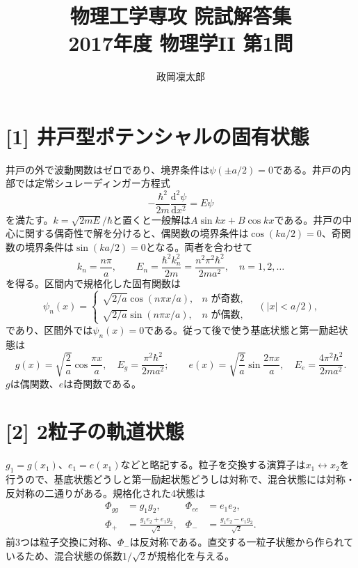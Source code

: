 \documentclass[11pt,a4paper]{article}
\title{物理工学専攻 院試解答集\\2017年度 物理学II 第1問}
\author{政岡凜太郎}
\date{}
\begin{document}
\maketitle

\section*{[1] 井戸型ポテンシャルの固有状態}
井戸の外で波動関数はゼロであり、境界条件は$\psi(\pm a/2)=0$である。井戸の内部では定常シュレーディンガー方程式
\begin{equation}
 -\frac{\hbar^2}{2m}\frac{\mathrm{d}^2\psi}{\mathrm{d}x^2}=E\psi
\end{equation}
を満たす。$k=\sqrt{2mE}/\hbar$と置くと一般解は$A\sin kx+B\cos kx$である。井戸の中心に関する偶奇性で解を分けると、偶関数の境界条件は$\cos(ka/2)=0$、奇関数の境界条件は$\sin(ka/2)=0$となる。両者を合わせて
\begin{equation}
 k_n=\frac{n\pi}{a},\qquad E_n=\frac{\hbar^2 k_n^2}{2m}
 =\frac{n^2\pi^2\hbar^2}{2ma^2},\quad n=1,2,\ldots
\end{equation}
を得る。区間内で規格化した固有関数は
\begin{equation}
 \psi_n(x)=\begin{cases}
 \sqrt{2/a}\cos(n\pi x/a),&n\text{ が奇数},\\
 \sqrt{2/a}\sin(n\pi x/a),&n\text{ が偶数},
 \end{cases}\quad (|x|<a/2),
\end{equation}
であり、区間外では$\psi_n(x)=0$である。従って後で使う基底状態と第一励起状態は
\begin{equation}
 g(x)=\sqrt{\frac2a}\cos\frac{\pi x}{a},\quad E_g=\frac{\pi^2\hbar^2}{2ma^2};\qquad
 e(x)=\sqrt{\frac2a}\sin\frac{2\pi x}{a},\quad E_e=\frac{4\pi^2\hbar^2}{2ma^2}.
\end{equation}
$g$は偶関数、$e$は奇関数である。

\section*{[2] 2粒子の軌道状態}
$g_1=g(x_1)$、$e_1=e(x_1)$などと略記する。粒子を交換する演算子は$x_1\leftrightarrow x_2$を行うので、基底状態どうしと第一励起状態どうしは対称で、混合状態には対称・反対称の二通りがある。規格化された4状態は
\begin{align}
 \Phi_{gg}&=g_1g_2,& \Phi_{ee}&=e_1e_2,\\
 \Phi_+&=\frac{g_1e_2+e_1g_2}{\sqrt2},&
 \Phi_-&=\frac{g_1e_2-e_1g_2}{\sqrt2}.
\end{align}
前3つは粒子交換に対称、$\Phi_-$は反対称である。直交する一粒子状態から作られているため、混合状態の係数$1/\sqrt2$が規格化を与える。
\end{document}
